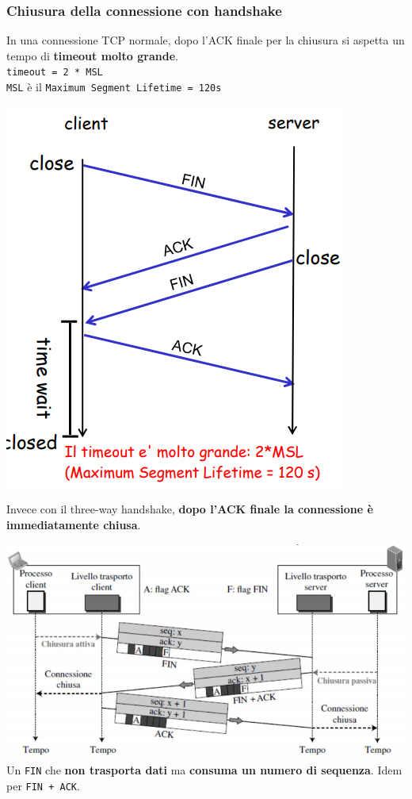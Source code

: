 \documentclass[10pt]{article}
\begin{document}
\subsubsection{Chiusura della connessione con handshake}
In una connessione TCP normale, dopo l'ACK finale per la chiusura si aspetta un tempo di \textbf{timeout molto grande}.\\
\texttt{timeout = 2 * MSL}\\
\texttt{MSL} è il \texttt{Maximum Segment Lifetime = 120s}
\begin{center}
\includegraphics[scale=0.7]{conntcpclose.png}
\end{center}
Invece con il three-way handshake, \textbf{dopo l'ACK finale la connessione è immediatamente chiusa}.
\begin{center}
\includegraphics[scale=0.7]{conntcphandshakeclose.png}\\
Un \texttt{FIN} che \textbf{non trasporta dati} ma \textbf{consuma un numero di sequenza}. Idem per \texttt{FIN + ACK}.
\end{center}
\pagebreak
\end{document}
